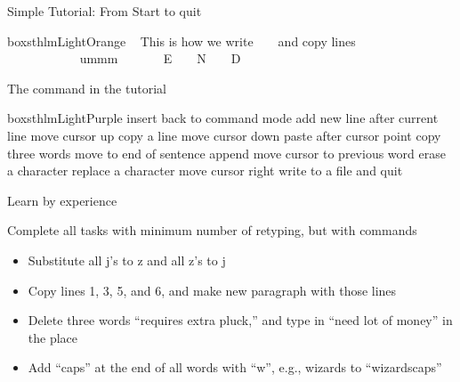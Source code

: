 \documentclass[newPxFont,sthlmFooter,nooffset]{beamer}
\begin{document}
\begin{frame}[containsverbatim,t]{Simple Tutorial: From Start to quit}
\begin{beamercolorbox}[sep=1em,wd=\linewidth]{boxsthlmLightOrange}
~ This is how we write ~ ~ and copy lines ~ ~ ~~ ~ ~ 
~ ~ ~ ~ ~ \keystroke{)}~ ~ ~ ~ ~ ~ ummm ~ ~ ~ ~ 
E ~ ~ N ~ ~ D \keystroke{:}~ ~ ~ ~
\end{beamercolorbox}

The command in the tutorial

\begin{beamercolorbox}[sep=1em,wd=\linewidth]{boxsthlmLightPurple}
 insert \hfill {} back to command mode \hfill {} add new line after current line \hfill {} move cursor up \hfill {} copy a line \hfill {} move cursor down \hfill {} paste after cursor point \hfill  {} copy three words \hfill \keystroke{)} move to end of sentence \hfill {} append \hfill {} move cursor to previous word \hfill {} erase a character \hfill {} replace a character \hfill {} move cursor right \hfill {} write to a file and quit 
\end{beamercolorbox}

\end{frame}



\begin{frame}[containsverbatim,t]{Learn by experience}




Complete all tasks with minimum number of retyping, but with commands
\begin{itemize}
\item Substitute all j's to z and all z's to j
\item Copy lines 1, 3, 5, and 6, and make new paragraph with those lines
\item Delete three words ``requires extra pluck,'' and type in ``need lot of money'' in the place
\item Add ``caps'' at the end of all words with ``w'', e.g., wizards to ``wizardscaps''
\end{itemize}


\end{frame}
\end{document}

